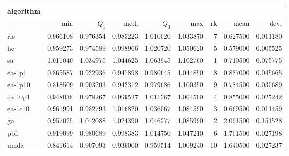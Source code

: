 \begin{tabular}{@{}l*{5}{>{{}}N{1}{2}}>{{}}N{2}{0}N{1}{3}N{1}{3}@{}}
\toprule
{algorithm} &  &  \\
\midrule
& {min} & {$Q_1$} & {med.} & {$Q_3$} & {max} & {rk} & {mean} & {dev.} \\
\midrule
rls & 0.966108 & 0.976354 & 0.985223 & 1.010020 & 1.033870 & 7 & 0.627500 & 0.011180 \\
 hc & 0.959273 & 0.974589 & 0.998966 & 1.020720 & 1.050620 & 5 & 0.579000 & 0.005525 \\
 sa & {\color{blue}} 1.011040 & {\color{blue}} 1.034975 & {\color{blue}} 1.044625 & {\color{blue}} 1.063945 & {\color{blue}} 1.102760 & 1 & 0.710500 & 0.075775 \\
 ea-1p1 & 0.865587 & 0.922936 & 0.947898 & 0.980645 & 1.044850 & 8 & 0.887000 & 0.045665 \\
 ea-1p10 & 0.818509 & 0.903203 & 0.942312 & 0.979686 & 1.100350 & 9 & 0.784500 & 0.030689 \\
 ea-10p1 & 0.948038 & 0.978267 & 0.999527 & 1.011367 & 1.064590 & 4 & 0.855000 & 0.027242 \\
 ea-1c10 & 0.961991 & 0.982793 & 1.016820 & 1.036067 & 1.084590 & 3 & 0.669500 & 0.011459 \\
 ga & 0.957025 & 1.012088 & 1.024390 & 1.046277 & 1.085990 & 2 & 2.091500 & 0.151528 \\
 pbil & 0.919099 & 0.980689 & 0.998383 & 1.014750 & 1.047210 & 6 & 1.701500 & 0.027198 \\
 umda & 0.841614 & 0.907093 & 0.936000 & 0.959514 & 1.009240 & 10 & 1.640500 & 0.027237 \\
 \bottomrule
\end{tabular}
